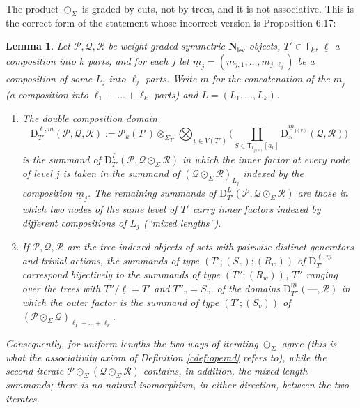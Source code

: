 \documentclass[12pt]{article}
\theoremstyle{plain}
\newtheorem{clemma}[ctheorem]{Lemma}
\theoremstyle{definition}
\theoremstyle{remark}
\newcommand{\Cal}[1]{\mathcal{#1}}
\newcommand{\Nl}{\mathbf{N}_{\mathsf{lev}}}
\newcommand{\circdot}{\odot}
\newcommand{\Tr}{\mathsf{T}}
\newcommand{\Dm}{\mathrm{D}}
\begin{document}
The product $\circdot_\Sigma$ is graded by cuts, not by trees, and it is not associative. This is the correct form of the statement whose incorrect version is Proposition 6.17:

\begin{clemma}\label{clem:assoc}
Let $\Cal P,\Cal Q,\Cal R$ be weight-graded symmetric $\Nl$-objects, $T'\in\Tr_k$, $\underline\ell$ a composition into $k$ parts, and for each $j$ let $\underline m_j=(m_{j,1},\dots,m_{j,\ell_j})$ be a composition of some $L_j$ into $\ell_j$ parts. Write $\underline m$ for the concatenation of the $\underline m_j$ (a composition into $\ell_1+\dots+\ell_k$ parts) and $\underline L=(L_1,\dots,L_k)$.
\begin{enumerate}[label=(\alph*),leftmargin=2em]
\item The \emph{double composition domain}
\[\Dm^{\underline\ell,\underline m}_{T'}(\Cal P,\Cal Q,\Cal R):=\Cal P_k(T')\otimes_{\Sigma_{T'}}\bigotimes_{v\in V(T')}\Big(\coprod_{S\in\Tr_{\ell_{j(v)}}[a_v]}\Dm^{\underline m_{j(v)}}_{S}(\Cal Q,\Cal R)\Big)\]
is the summand of $\Dm^{\underline L}_{T'}(\Cal P,\Cal Q\circdot_\Sigma\Cal R)$ in which the inner factor at every node of level $j$ is taken in the summand of $(\Cal Q\circdot_\Sigma\Cal R)_{L_j}$ indexed by the composition $\underline m_j$. The remaining summands of $\Dm^{\underline L}_{T'}(\Cal P,\Cal Q\circdot_\Sigma\Cal R)$ are those in which two nodes of the same level of $T'$ carry inner factors indexed by different compositions of $L_j$ (``mixed lengths'').
\item If $\Cal P,\Cal Q,\Cal R$ are the tree-indexed objects of sets with pairwise distinct generators and trivial actions, the summands of type $(T';(S_v);(R_w))$ of $\Dm^{\underline\ell,\underline m}_{T'}$ correspond bijectively to the summands of type $(T'';(R_w))$, $T''$ ranging over the trees with $T''/\underline\ell=T'$ and $T''_v=S_v$, of the domains $\Dm^{\underline m}_{T''}(\text{---},\Cal R)$ in which the outer factor is the summand of type $(T';(S_v))$ of $(\Cal P\circdot_\Sigma\Cal Q)_{\ell_1+\dots+\ell_k}$.
\end{enumerate}
Consequently, for uniform lengths the two ways of iterating $\circdot_\Sigma$ agree (this is what the associativity axiom of Definition \ref{cdef:operad} refers to), while the second iterate $\Cal P\circdot_\Sigma(\Cal Q\circdot_\Sigma\Cal R)$ contains, in addition, the mixed-length summands; there is no natural isomorphism, in either direction, between the two iterates.
\end{clemma}
\end{document}
